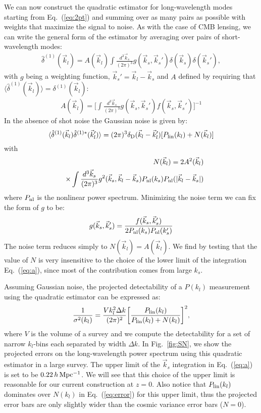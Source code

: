 \documentclass[prd,amsmath,amssymb,floatfix,superscriptaddress,nofootinbib,twocolumn]{revtex4-1}
\def\be{\begin{equation}}
\def\ee{\end{equation}}
\newcommand{\vs}{\nonumber\\}
\newcommand{\vk}{\vec{k}}
\newcommand{\ec}[1]{Eq.~(\ref{eq:#1})}
\newcommand{\eql}[1]{\label{eq:#1}}
\newcommand{\rf}[1]{\ref{fig:#1}}
\begin{document}
\label{sec2}
We can now construct the quadratic estimator for long-wavelength modes starting from \ec{2pt} and summing over as many pairs as possible with weights that maximize the signal to noise. As with the case of CMB lensing, we can write the general form of the estimator by averaging over pairs of short-wavelength modes:
\begin{eqnarray}
\hat{\delta}^{(1)}(\vec{k}_l)=A(\vec{k}_l)\int \frac{d^3 \vec{k}_s}{(2\pi)^3} g(\vec{k}_s,\vec{k}_s'){\delta}(\vec{k}_s){\delta}(\vec{k}_s') \eql{quadest},
\end{eqnarray} 
with $g$ being a weighting function, $\vk_s'=\vk_l-\vk_s$ and $A$  defined by requiring that $\langle \hat{\delta}^{(1)}(\vec{k}_l) \rangle={\delta}^{(1)}(\vec{k}_l)$:
\begin{eqnarray}
A(\vec{k}_l)=\bigg[\int \frac{d^3 \vec{k}_s}{(2\pi)^3} g(\vec{k}_s,\vec{k}_s')f(\vec{k}_s,\vec{k}_s')  \bigg]^{-1} \eql{a}
\end{eqnarray}
In the absence of shot noise the Gaussian noise is given by:
\be 
\langle \hat{\delta}^{(1)}(\vk_{l})\hat{\delta}^{(1)*}(\vk_{l}') \rangle = (2\pi)^3 \delta_{\rm D}(\vk_{l}-\vk_{l}')[P_{\rm lin}(k_{l})+N(\vk_l)]
\ee 
with 
\begin{eqnarray}
&&N(\vec{k}_{l})=2A^2(\vk_{l})\vs
&&\times\int \frac{d^3 \vec{k}_{s}}{(2\pi)^3} g^2(\vec{k}_{s},\vk_l-\vec{k}_{s})P_{\rm nl}(k_{s})P_{\rm nl}(|\vk_l-\vk_s|)
\end{eqnarray}
where $P_{\rm nl}$ is the nonlinear power spectrum. Minimizing the noise term we can fix the form of $g$ to be:
\begin{eqnarray}
g(\vec{k}_{s},\vec{k}_{s}')=\frac{f(\vec{k}_{s},\vec{k}_{s}')}{2P_{\rm nl}(k_{s})P_{\rm nl}(k_{s}')}
\end{eqnarray} 
The noise term reduces simply to $N(\vk_l)=A(\vk_l)$. We find by testing that the value of $N$ is very insensitive to the choice of the lower limit of the integration \ec{a}, since most of the contribution comes from large $k_s$. 

Assuming Gaussian noise, the projected detectability of a $P(k_l)$ measurement using the quadratic estimator can be expressed as:
\be
\frac{1}{\sigma^{2}(k_l)}=\frac{V k_l^2 \Delta k }{(2\pi)^2}\bigg[\frac{P_{\rm lin}(k_l)}{P_{\rm lin}(k_l)+N(k_l) }\bigg]^2 \eql{error},
\ee
where $V$ is the volume of a survey and we compute the detectability for a set of narrow $k_l$-bins each separated by width $\Delta k$.
In Fig.~\rf{SN}, we show the projected errors on the long-wavelength power spectrum using this quadratic estimator in a large survey. The upper limit of the $\vk_s$ integration in \ec{a} is set to be $0.22\,h\,\rm Mpc^{-1}$. We will see that this choice of the upper limit is reasonable for our current construction at $z=0$. Also notice that $P_{\rm lin}(k_l)$ dominates over $N(k_l)$ in \ec{error} for this upper limit, thus the projected error bars are only slightly wider than the cosmic variance error bars ($N=0$).
\end{document}
